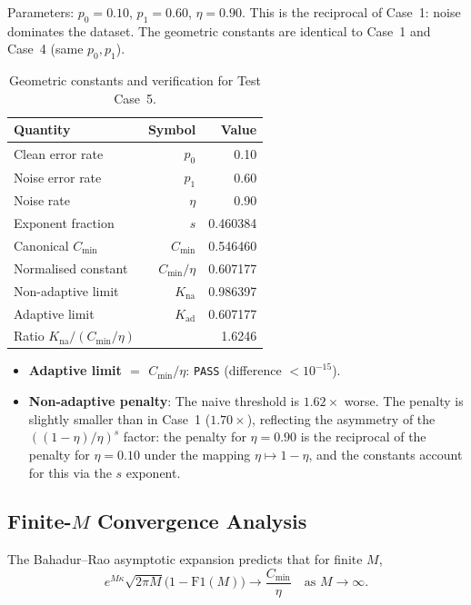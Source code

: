 Parameters: $p_0 = 0.10$, $p_1 = 0.60$, $\eta = 0.90$. This is the reciprocal of Case~1: noise dominates the dataset. The geometric constants are identical to Case~1 and Case~4 (same $p_0, p_1$).

\begin{table}[htbp]
\centering
\caption{Geometric constants and verification for Test Case~5.}
\label{tab:case5}
\begin{tabular}{lrr}
\toprule
Quantity & Symbol & Value \\
\midrule
Clean error rate & $p_0$ & 0.10 \\
Noise error rate & $p_1$ & 0.60 \\
Noise rate & $\eta$ & 0.90 \\
Exponent fraction & $s$ & 0.460384 \\
\midrule
Canonical $C_{\min}$ & $C_{\min}$ & 0.546460 \\
Normalised constant & $C_{\min}/\eta$ & 0.607177 \\
Non-adaptive limit & $K_{\mathrm{na}}$ & 0.986397 \\
Adaptive limit & $K_{\mathrm{ad}}$ & 0.607177 \\
Ratio $K_{\mathrm{na}} / (C_{\min}/\eta)$ & & 1.6246 \\
\bottomrule
\end{tabular}
\end{table}

\begin{itemize}
    \item\textbf{Adaptive limit $=$ $C_{\min}/\eta$}: \texttt{PASS} (difference $< 10^{-15}$).
    \item\textbf{Non-adaptive penalty}: The naive threshold is $1.62\times$ worse. The penalty is slightly smaller than in Case~1 ($1.70\times$), reflecting the asymmetry of the $((1-\eta)/\eta)^s$ factor: the penalty for $\eta=0.90$ is the reciprocal of the penalty for $\eta=0.10$ under the mapping $\eta \mapsto 1-\eta$, and the constants account for this via the $s$ exponent.
\end{itemize}

\subsection{Finite-$M$ Convergence Analysis}

The Bahadur--Rao asymptotic expansion predicts that for finite $M$,
\begin{equation}
e^{M\kappa} \sqrt{2\pi M} \bigl(1 - \mathrm{F1}(M)\bigr) \longrightarrow \frac{C_{\min}}{\eta} \quad \text{as } M\to\infty.
\end{equation}

